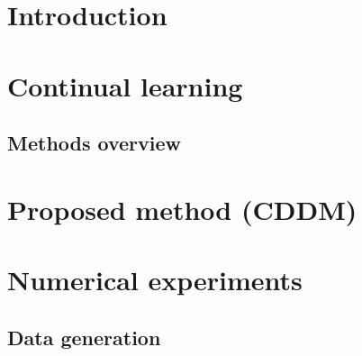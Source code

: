 \documentclass[a4paper,fleqn]{cas-sc}
\begin{document}




\section{Introduction}\label{sec:intro}
  
\section{Continual learning}\label{sec:cl}

\subsection{Methods overview}\label{subsec:overview}

\section{Proposed method (CDDM)}\label{sec:method}

\section{Numerical experiments}\label{sec:numerical_exp}
\subsection{Data generation}\label{subsec:data}
  
\end{document}
